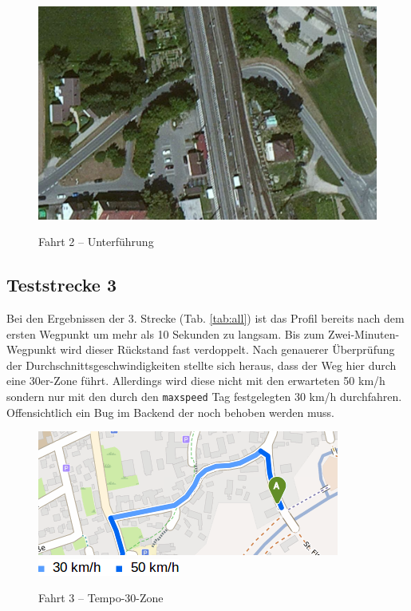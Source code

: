 \begin{figure}[h]
\centering
\caption{Fahrt 2 -- Unterführung}
\label{fig:traintunnel}
\includegraphics[width = 0.70 \textwidth]{../media/traintunnel.png} \\
\end{figure}


\subsection{Teststrecke 3}

Bei den Ergebnissen der 3. Strecke (Tab. \ref{tab:all}) ist das Profil bereits nach dem ersten Wegpunkt um mehr als 10 Sekunden zu langsam.
Bis zum Zwei-Minuten-Wegpunkt wird dieser Rückstand fast verdoppelt.
Nach genauerer Überprüfung der Durchschnittsgeschwindigkeiten stellte sich heraus, dass der Weg hier durch eine 30er-Zone führt.
Allerdings wird diese nicht mit den erwarteten 50 km/h sondern nur mit den durch den \texttt{maxspeed} Tag festgelegten 30 km/h durchfahren.
Offensichtlich ein Bug im Backend der noch behoben werden muss.

\begin{figure}[h]
\centering
\caption{Fahrt 3 -- Tempo-30-Zone}
\label{fig:temp30}
\includegraphics[width = 0.60 \textwidth]{../media/Fahrt3_temp30.png} \\
\includegraphics[width = 0.20 \textwidth]{../media/legend3.png} \\
\end{figure}

